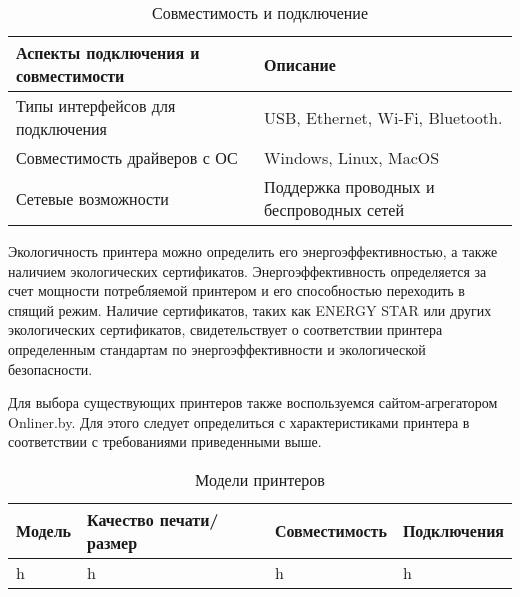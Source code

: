 \begin{table}[ht]
    \caption{Совместимость и подключение}
    \label{table:func:printersConnectionProperty}
    \begin{tabular}{| >{\raggedright}m{}
                    | >{\raggedright\arraybackslash}m{}|}
        \hline
        \centering Аспекты подключения и совместимости & \centering\arraybackslash Описание \\

        \hline
        Типы интерфейсов для подключения &
        USB, Ethernet, Wi-Fi, Bluetooth.
        \\
        \hline
        Совместимость драйверов с ОС &
        Windows, Linux, MacOS
        \\
        \hline
        Сетевые возможности &
        Поддержка проводных и беспроводных сетей
        \\
        
        \hline
    \end{tabular}
\end{table}

Экологичность принтера можно определить его энергоэффективностью, а также наличием экологических сертификатов. 
Энергоэффективность определяется за счет мощности потребляемой принтером и его способностью переходить в спящий режим. 
Наличие сертификатов, таких как ENERGY STAR или других экологических сертификатов, свидетельствует о соответствии принтера 
определенным стандартам по энергоэффективности и экологической безопасности.

Для выбора существующих принтеров также воспользуемся сайтом-агрегатором Onliner.by. Для этого следует определиться с характеристиками
принтера в соответствии с требованиями приведенными выше.

\begin{table}[ht]
    \caption{Модели принтеров}
    \label{table:func:printersList}
    \begin{tabular}{| >{\raggedright}m{}
                    | >{\raggedright\arraybackslash}m{}
                    | >{\raggedright\arraybackslash}m{}
                    | >{\raggedright\arraybackslash}m{}|}
        \hline
        \centering Модель
        & \centering\arraybackslash Качество печати/размер
        & \centering\arraybackslash Совместимость 
        & \centering\arraybackslash Подключения \\

        \hline
        h & h & h & h
        \\
        
        \hline
    \end{tabular}
\end{table}

